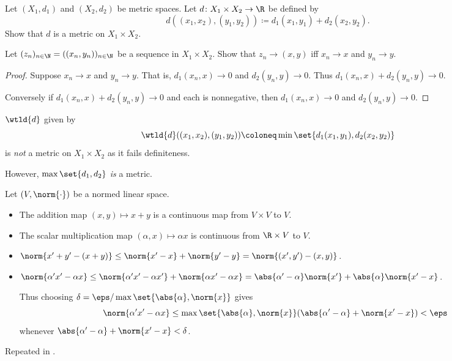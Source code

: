 \begin{exercise}
    Let $(X_1, d_1)$ and $(X_2, d_2)$ be metric spaces.
    Let $d\colon X_1 \times X_2 \to \R$ be defined by \[
        d((x_1, x_2), (y_1, y_2)) \coloneq d_1(x_1, y_1) + d_2(x_2, y_2).
    \] Show that $d$ is a metric on $X_1 \times X_2$.

    Let $(z_n)_{n \in \N} = ((x_n, y_n))_{n \in \N}$ be a sequence in
    $X_1 \times X_2$.
    Show that $z_n \to (x, y)$ iff $x_n \to x$ and $y_n \to y$.
\end{exercise}
\begin{proof}
    Suppose $x_n \to x$ and $y_n \to y$.
    That is, $d_1(x_n, x) \to 0$ and $d_2(y_n, y) \to 0$.
    Thus $d_1(x_n, x) + d_2(y_n, y) \to 0$.

    Conversely if $d_1(x_n, x) + d_2(y_n, y) \to 0$ and each is nonnegative,
    then $d_1(x_n, x) \to 0$ and $d_2(y_n, y) \to 0$.
\end{proof}

\begin{remark}
    $\wtld{d}$ given by \[
        \wtld{d}((x_1, x_2), (y_1, y_2)) \coloneq
            \min\set{d_1(x_1, y_1), d_2(x_2, y_2)}
    \] is \emph{not} a metric on $X_1 \times X_2$ as it fails definiteness.

    However, $\max\set{d_1, d_2}$ \emph{is} a metric.
\end{remark}

\begin{exercise}
    Let $(V, \norm{\cdot})$ be a normed linear space.
    \begin{itemize}
        \item The addition map $(x, y) \mapsto x + y$ is a continuous map
        from $V \times V$ to $V$.
        \item The scalar multiplication map $(\alpha, x) \mapsto \alpha x$
        is continuous from $\R \times V$ to $V$.
    \end{itemize}
\end{exercise}
\begin{solution} \leavevmode
    \begin{itemize}
        \item $\norm{x' + y' - (x + y)} \le \norm{x' - x} + \norm{y' - y}
        = \norm{(x', y') - (x, y)}$.
        \item $\norm{\alpha' x' - \alpha x} \le \norm{\alpha' x' - \alpha x'}
        + \norm{\alpha x' - \alpha x} = \abs{\alpha' - \alpha} \norm{x'}
        + \abs{\alpha} \norm{x' - x}$.

        Thus choosing $\delta = \eps / \max\set{\abs{\alpha}, \norm{x}}$
        gives \[
            \norm{\alpha' x' - \alpha x} \le \max\set{\abs{\alpha}, \norm{x}}
                (\abs{\alpha' - \alpha} + \norm{x' - x}) < \eps
        \] whenever $\abs{\alpha' - \alpha} + \norm{x' - x} < \delta$.
    \end{itemize}
    Repeated in .
\end{solution}


